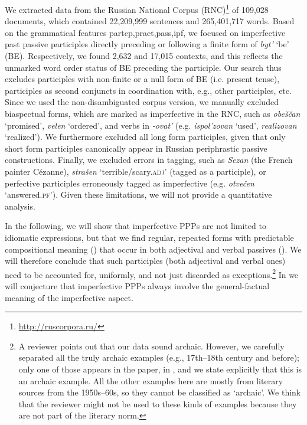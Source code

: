 \documentclass[output=paper,modfonts,newtxmath,hidelinks
]{langscibook}
\begin{document}
We extracted data from the Russian National Corpus (RNC)\footnote{\url{http://ruscorpora.ru/}} of 109,028 documents, which contained 22,209,999 sentences and 265,401,717 words.  Based on the grammatical features partcp,praet,pass,ipf, we focused on imperfective past passive participles directly preceding or following a finite form of \textit{byt'} `be' (BE). Respectively, we found 2,632 and 17,015 contexts, and this reflects the unmarked word order status of BE preceding the participle. Our search thus excludes participles with non-finite or a null form of BE (i.e. present tense), participles as second conjuncts in coordination with, e.g., other participles, etc. Since we used the non-disambiguated corpus version, we manually excluded biaspectual forms, which are marked as imperfective in the RNC, such as \textit{obeščan} `promised', \textit{velen} `ordered', and verbs in \textit{-ovat'} (e.g. \textit{ispol'zovan} `used', \textit{realizovan} `realized'). We furthermore excluded all long form participles, given that only short form participles canonically appear in Russian periphrastic passive constructions. Finally, we excluded errors in tagging, such as \textit{Sezan} (the French painter Cézanne), \textit{strašen} `terrible/scary.\textsc{adj}' (tagged as a participle), or perfective participles erroneously tagged as imperfective (e.g. \textit{otvečen} `answered.\textsc{pf}'). Given these limitations, we will not provide a quantitative analysis. 
 
\largerpage
In the following, we will show that imperfective PPPs are not limited to idiomatic expressions, but that we find regular, repeated forms with predictable compositional meaning () that occur in both adjectival and verbal passives (). We will therefore conclude that such participles (both adjectival and verbal ones) need to be accounted for, uniformly, and not just discarded as exceptions.\footnote{A reviewer points out that our data sound archaic. However, we carefully separated all the truly archaic examples (e.g., 17th--18th century and before); only one of those appears in the paper, in , and we state explicitly that this is an archaic example. All the other examples here are mostly from literary sources from the 1950s--60s, so they cannot be classified as `archaic'. We think that the reviewer might not be used to these kinds of examples because they are not part of the literary norm.} In  we will conjecture that imperfective PPPs always involve the general-factual meaning of the imperfective aspect.
\end{document}
